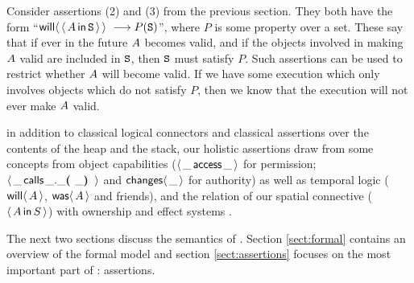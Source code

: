 Consider assertions (2) and (3) from the previous section. They
  both have the form ``$\Future {\Using {\A} {\SF}}\ \longrightarrow P(\SF)$'',
  where $P$ is some property over a set. These  say that if
  ever in the future $A$ becomes valid, and if the objects involved
  in making $A$ valid are included in ${{\mbox{\tt{S}}}}$, then  ${{\mbox{\tt{S}}}}$ must satisfy
  $P$. Such assertions can be used to restrict whether $A$ will
  become valid. If we have some execution which only involves objects which do not satisfy $P$, then we know that the execution will not ever make $A$ valid.



 in addition to classical 
logical connectors and classical assertions over the contents of the heap and the stack, 
our holistic assertions draw from some concepts from object capabilities
($\langle\, \_\, \mathsf{access}\, \_\, \rangle$  for  permission; $\langle\, \_\, \mathsf{calls}\, \_.\_{\mbox{\tt{\mbox{\tt{\bf{( }}}}}}\_{\mbox{\tt{\mbox{\tt{\bf{) }}}}}}\, \rangle$ and  ${\mathsf{changes}}\langle\,\_\,\rangle$ for
authority) 
as well as temporal logic (${\mathsf{will}}\langle \,A\,\rangle$, ${\mathsf{was}}\langle \,A\,\rangle$ and friends), and the relation of
our spatial connective ($\langle\, A\, \mathsf{in}\, S\, \rangle$)  with ownership and effect
systems \cite{typeEffect,ownalias,ownEncaps}.

The next two sections  discuss the semantics of \Chainmail. Section \ref{sect:formal}
contains an overview of the formal model and section \ref{sect:assertions} focuses on the most important part of \Chainmail : assertions.




